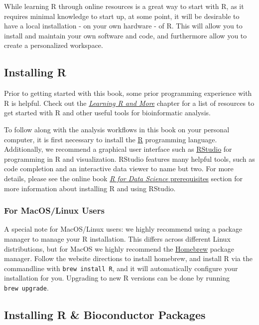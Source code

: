 \documentclass[]{book}
\begin{document}
While learning R through online resources is a great way to start with R, as it requires minimal knowledge to start up, at some point, it will be desirable to have a local installation - on your own hardware - of R. This will allow you to install and maintain your own software and code, and furthermore allow you to create a personalized workspace.

\hypertarget{installing-r}{%
\subsection{Installing R}\label{installing-r}}

Prior to getting started with this book, some prior programming experience with R is helpful. Check out the \protect\hyperlink{learning-r-and-more}{\emph{Learning R and More}} chapter for a list of resources to get started with R and other useful tools for bioinformatic analysis.

To follow along with the analysis workflows in this book on your personal computer, it is first necessary to install the \href{http://www.r-project.org/}{R} programming language. Additionally, we recommend a graphical user interface such as \href{http://www.rstudio.com/download}{RStudio} for programming in R and visualization. RStudio features many helpful tools, such as code completion and an interactive data viewer to name but two. For more details, please see the online book \href{https://r4ds.had.co.nz/introduction.html\#prerequisites}{\emph{R for Data Science} prerequisites} section for more information about installing R and using RStudio.

\hypertarget{for-macoslinux-users}{%
\subsubsection{For MacOS/Linux Users}\label{for-macoslinux-users}}

A special note for MacOS/Linux users: we highly recommend using a package manager to manage your R installation. This differs across different Linux distributions, but for MacOS we highly recommend the \href{https://brew.sh/}{Homebrew} package manager. Follow the website directions to install homebrew, and install R via the commandline with \texttt{brew\ install\ R}, and it will automatically configure your installation for you. Upgrading to new R versions can be done by running \texttt{brew\ upgrade}.

\hypertarget{installing-r-bioconductor-packages}{%
\subsection{Installing R \& Bioconductor Packages}\label{installing-r-bioconductor-packages}}
\end{document}
